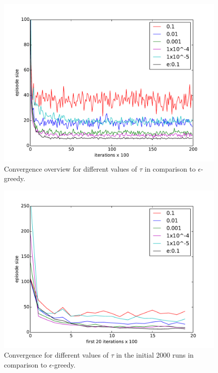 \documentclass[paper=a4, fontsize=11pt]{scrartcl}
\numberwithin{equation}{section}		%
\numberwithin{figure}{section}			%
\numberwithin{table}{section}				%
\begin{document}
\begin{figure}[H] \centering
\includegraphics[scale=0.5]{softmaxOverview.pdf}
\caption{Convergence overview for different values of $\tau$ in comparison to $\epsilon$-greedy.} 
\label{figure:softmaxOverview}
\end{figure}
\begin{figure}[H] \centering
\includegraphics[scale=0.5]{softmaxfirst20x100.pdf}
\caption{Convergence for different values of $\tau$ in the initial 2000 runs in comparison to $\epsilon$-greedy.} 
\label{figure:softmaxfirst20}
\end{figure}
\end{document}
